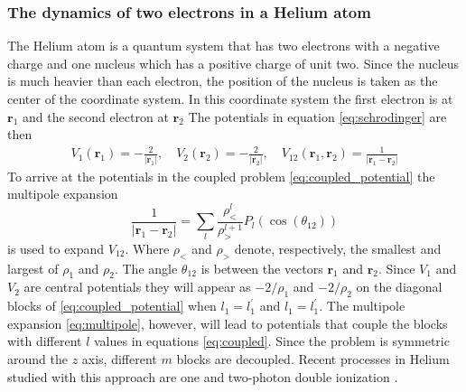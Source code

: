 \documentclass[mathpazo]{cicp}
\theoremstyle{definition}
\numberwithin{equation}{section}
\providecommand{\hbz}{}
\begin{document}
\subsubsection{The dynamics of two electrons in  a Helium atom}
The Helium atom is a quantum system that has two electrons with a negative charge
and one nucleus \hbz{which} has a positive charge of unit two.
Since the nucleus is much heavier than each electron, the position of the
nucleus is taken as the center of the coordinate system.
In this coordinate system the first electron is at $\mathbold{r}_1$ and the second electron at
$\mathbold{r}_2$ The potentials in equation \eqref{eq:schrodinger} are then
\begin{equation}
\begin{aligned}
  V_1(\mathbold{r}_1) = -\frac{2}{|\mathbold{r}_1|},\quad  V_2(\mathbold{r}_2) = -\frac{2}{|\mathbold{r}_2|} ,\quad   V_{12}(\mathbold{r}_1,\mathbold{r}_2) = \frac{1}{|\mathbold{r}_1-\mathbold{r}_2|}
\end{aligned}
\end{equation}
To arrive at the potentials in the coupled problem \eqref{eq:coupled_potential} the multipole expansion
\begin{equation}
 \frac{1}{|\mathbold{r}_1-\mathbold{r}_2|} = \sum_l \frac{\rho_<^l}{\rho_>^{l+1}} P_l(\cos(\theta_{12}))  \label{eq:multipole}
\end{equation}
is used to expand $V_{12}$. Where $\rho_<$ and $\rho_>$ denote,
respectively, the smallest and largest of $\rho_1$ and $\rho_2$. The
angle $\theta_{12}$ is between the vectors $\mathbold{r}_1$ and
$\mathbold{r}_2$.  Since $V_1$ and $V_2$ are central potentials they
will appear as $-2/\rho_1$ and $-2/\rho_2$ on the diagonal blocks of
\eqref{eq:coupled_potential} when $l_1=l_1^\prime$ and
$l_1=l_1^\prime$.  The multipole expansion \eqref{eq:multipole},
however, will lead to potentials that couple the blocks with different
$l$ values in equations \eqref{eq:coupled}.  Since the problem is
symmetric around the $z$ axis, different $m$ blocks are
decoupled. Recent processes in Helium studied with this approach are
one and two-photon double ionization
\cite{mccurdy2004theoretical,horner2007two}.
\end{document}
